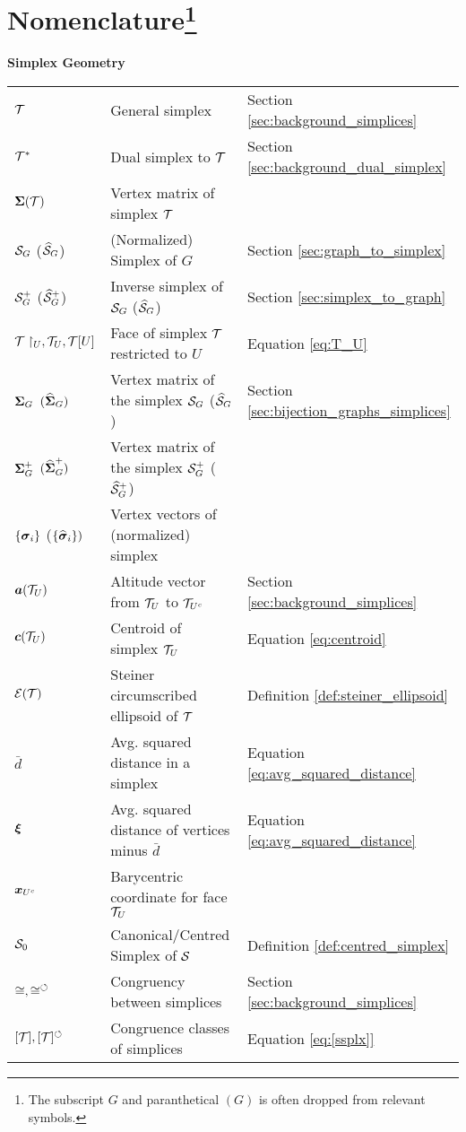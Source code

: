 \chapter*{Nomenclature\footnote{The subscript $G$ and paranthetical $(G)$ is often dropped from relevant symbols.}}

\newlength{\colwidth} %
\newlength{\groupsep} %
\newlength{\headingsep} %
\newlength{\descsep} %
\setlength{\colwidth}{3.5cm}
\setlength{\groupsep}{1cm}
\setlength{\headingsep}{0.00cm}
\setlength{\descsep}{8cm}

\textbf{Simplex Geometry}\\
\vspace{\headingsep}
\begin{longtable}{p{\colwidth}p{\descsep}l}
	{$\mathcal{T}$} & {General simplex} & Section \ref{sec:background_simplices} \\
	$\mathcal{T}^*$ & Dual simplex to $\mathcal{T}$ & Section \ref{sec:background_dual_simplex} \\
	$\boldsymbol{\Sigma}(\mathcal{T})$ & Vertex matrix of simplex $\mathcal{T}$ \\
	$\mathcal{S}_G$ ($\widehat{\mathcal{S}}_G$)  &  (Normalized) Simplex of $G$ & Section \ref{sec:graph_to_simplex} \\
	$\mathcal{S}^+_G$ ($\widehat{\mathcal{S}}^+_G$)	& Inverse simplex of $\mathcal{S}_G$ ($\widehat{\mathcal{S}}_G$) & Section \ref{sec:simplex_to_graph}\\
	{$\mathcal{T}\restriction_U, \mathcal{T}_U, \mathcal{T}[U]$} & {Face of simplex $\mathcal{T}$ restricted to $U$ } & Equation  \eqref{eq:T_U}\\ 
	{$\boldsymbol{\Sigma}_G$ $(\widehat{\boldsymbol{\Sigma}}_G)$} & Vertex matrix of the simplex $\mathcal{S}_G$ ($\widehat{\mathcal{S}}_G$) & Section \ref{sec:bijection_graphs_simplices}\\
	{$\boldsymbol{\Sigma}_G^+$ $(\widehat{\boldsymbol{\Sigma}}_G^+)$} & Vertex matrix of the simplex $\mathcal{S}_G^+$ ($\widehat{\mathcal{S}}_G^+$) \\
	{$\{\vb*{\sigma}_i\}$ ($\{\widehat{\vb*{\sigma}}_i\})$} & {Vertex vectors of (normalized) simplex}\\
	{$\vb*{a}(\mathcal{T}_U)$} & {Altitude vector from $\mathcal{T}_U$ to $\mathcal{T}_{U^c}$} & Section \ref{sec:background_simplices}\\
	{$\vb*{c}(\mathcal{T}_U)$} & {Centroid of simplex $\mathcal{T}_U$} & Equation \eqref{eq:centroid} \\
	$\mathcal{E}(\mathcal{T})$ & Steiner circumscribed ellipsoid  of $\mathcal{T}$ & Definition \ref{def:steiner_ellipsoid}\\
	$\bar{d}$ & Avg. squared distance in a simplex & Equation \eqref{eq:avg_squared_distance}\\
	$\vb*{\xi}$ & Avg. squared distance of vertices minus $\bar{d}$ & Equation \eqref{eq:avg_squared_distance}\\
	$\vb*{x}_{U^c}$ & Barycentric coordinate for face $\mathcal{T}_U$ & \\
	$\mathcal{S}_0$ & Canonical/Centred Simplex of $\mathcal{S}$ & Definition \ref{def:centred_simplex} \\
	$\cong,\cong^\circlearrowleft$ & Congruency between simplices & Section \ref{sec:background_simplices} \\
	$[\mathcal{T}],[\mathcal{T}]^\circlearrowleft$ & Congruence classes of simplices & Equation \eqref{eq:[ssplx]}
\end{longtable}
